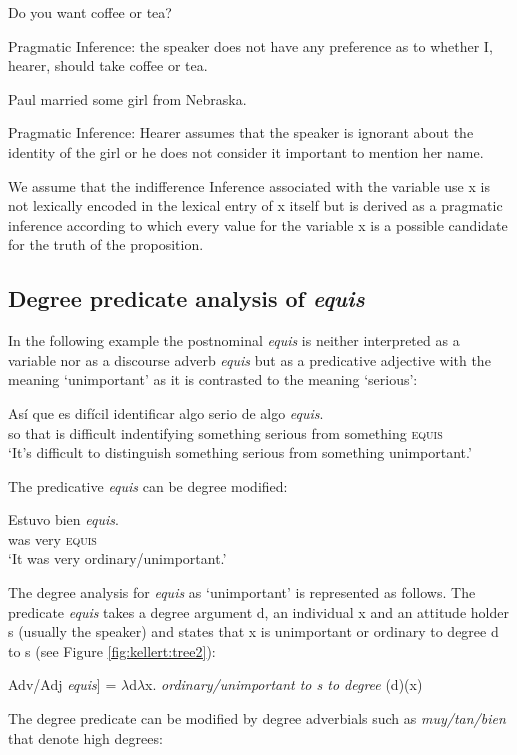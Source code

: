 \documentclass[output=paper]{langsci/langscibook}
\begin{document}
\ea Do you want coffee or tea?
\par
Pragmatic Inference: the speaker does not have any preference as to whether I, hearer, should take coffee or tea.
\z

\ea Paul married some girl from Nebraska.
\par
Pragmatic Inference: Hearer assumes that the speaker is ignorant about the 	identity of the girl or he does not consider it important to mention her name.
\z

We assume that the indifference Inference associated with the variable use x is not lexically encoded in the lexical entry of x itself but is derived as a pragmatic inference according to which every value for the variable x is a possible candidate for the truth of the proposition.

\subsection{Degree predicate analysis of \textit{equis}}\label{sec:kellert:3.3}
In the following example the postnominal \textit{equis} is neither interpreted as a variable nor as a discourse adverb \textit{equis} but as a predicative adjective with the meaning ‘unimportant’ as it is contrasted to the meaning ‘serious’:

\ea
\gll Así que es difícil identificar algo serio de algo \textit{equis}.\\
so that is difficult indentifying something serious from something	\textsc{equis}\\
\glt ‘It’s difficult to distinguish something serious from something unimportant.’
\z

The predicative \textit{equis} can be degree modified:

\ea
\gll Estuvo bien \textit{equis}.\\
was very \textsc{equis}\\
\glt `It was very ordinary/unimportant.’
\z

The degree analysis for \textit{equis} as ‘unimportant’ is represented as follows. The predicate \textit{equis} takes a degree argument d, an individual x and an attitude holder s (usually the speaker) and states that x is unimportant or ordinary to degree d to s (see Figure \ref{fig:kellert:tree2}):

\ea {[}Adv/Adj \textit{equis}{]} = $\lambda$d$\lambda$x. \textit{ordinary/unimportant to s to degree} (d)(x)
\z

The degree predicate can be modified by degree adverbials such as \textit{muy/tan/bien} that denote high degrees:
\end{document}
